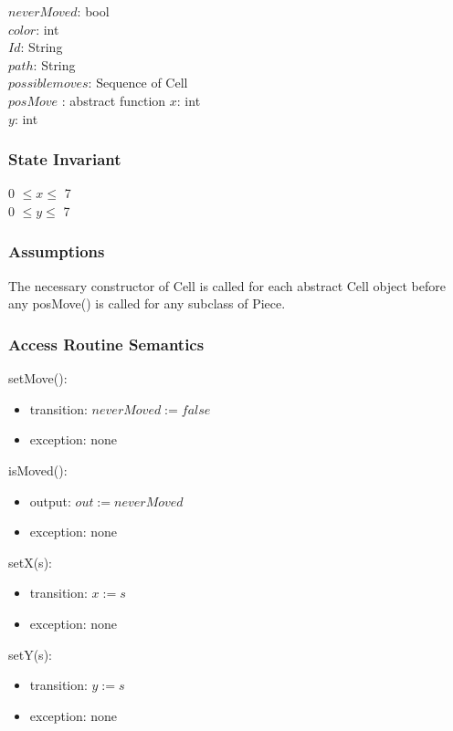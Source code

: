 \documentclass[12pt]{article}
\begin{document}
$neverMoved$: bool\\
$color$: int \\
$Id$: String \\
$path$: String\\
$possiblemoves$: Sequence of Cell \\
$posMove$ : abstract function
$x$: int\\
$y$: int\\

\subsubsection* {State Invariant}

0 $\leq x \leq$ 7\\
0 $\leq y \leq$ 7 

\subsubsection* {Assumptions}
The necessary constructor of Cell is called for each abstract Cell object before any
posMove() is called for any subclass of Piece. 

\subsubsection* {Access Routine Semantics}

setMove():
\begin{itemize}
\item transition: $neverMoved := false$
\item exception: none
\end{itemize}

\noindent isMoved():
\begin{itemize}
\item output: $out := neverMoved$
\item exception: none
\end{itemize}

\noindent setX(s):
\begin{itemize}
\item transition: $x := s$
\item exception: none
\end{itemize}

\noindent setY(s):
\begin{itemize}
\item transition: $y := s$
\item exception: none
\end{itemize}
\end{document}
